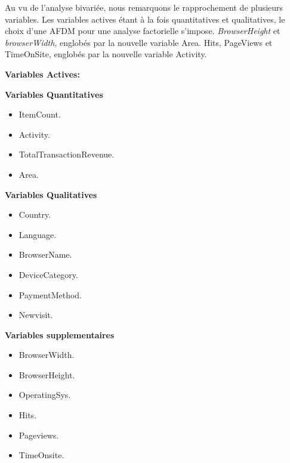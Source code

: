 
Au vu de l'analyse bivariée, nous remarquons le rapprochement de plusieurs variables. Les variables actives étant à la fois quantitatives et qualitatives, le choix d'une AFDM pour une  analyse factorielle s'impose. 
\emph{BrowserHeight} et \emph{browserWidth}, englobés par la nouvelle variable Area. Hits, PageViews et TimeOnSite, englobés par la nouvelle variable Activity.


\textbf{Variables Actives:} 

\textbf{Variables Quantitatives} 
\begin{itemize}
  \item ItemCount.
  \item Activity.
  \item TotalTransactionRevenue.
  \item Area.
\end{itemize}


\textbf{Variables Qualitatives} 
\begin{itemize}
  \item Country.
  \item Language.
  \item BrowserName.
  \item DeviceCategory.
  \item PaymentMethod.
  \item Newvisit.
\end{itemize}



\textbf{Variables supplementaires} 
\begin{itemize}
  \item BrowserWidth.
  \item BrowserHeight.
  \item OperatingSys.
  \item Hits.
  \item Pageviews.
  \item TimeOnsite.
\end{itemize}





